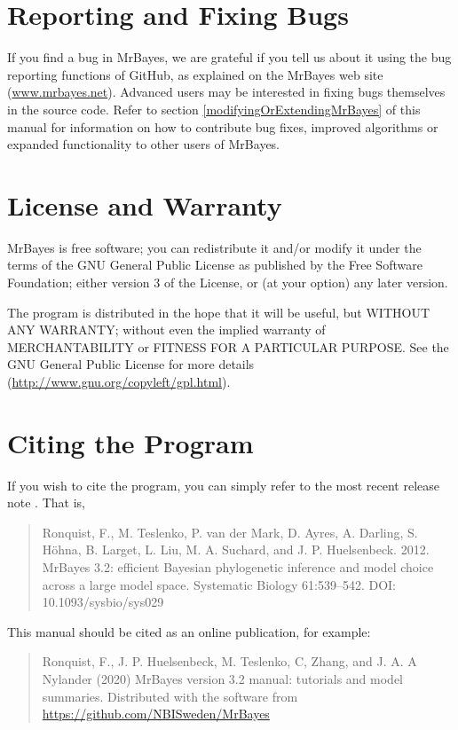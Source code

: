\documentclass[12pt]{book}
\begin{document}
\section{Reporting and Fixing Bugs}

If you find a bug in MrBayes, we are grateful if you tell us about it using the bug reporting
functions of GitHub, as explained on the MrBayes web site (\url{www.mrbayes.net}).  Advanced users
may be interested in fixing bugs themselves in the source code. Refer to section
\ref{modifyingOrExtendingMrBayes} of this manual for information on how to contribute bug fixes,
improved algorithms or expanded functionality to other users of MrBayes.

\section{License and Warranty}

MrBayes is free software; you can redistribute it and/or modify it under the terms of the GNU
General Public License as published by the Free Software Foundation; either version 3 of the
License, or (at your option) any later version.

The program is distributed in the hope that it will be useful, but WITHOUT ANY WARRANTY; without
even the implied warranty of MERCHANTABILITY or FITNESS FOR A PARTICULAR PURPOSE. See the GNU
General Public License for more details (\url{http://www.gnu.org/copyleft/gpl.html}).

\section{Citing the Program}

If you wish to cite the program, you can simply refer to the most recent release note
\citep{ronquist12b}. That is,

\begin{quote}\footnotesize
Ronquist, F., M. Teslenko, P. van der Mark, D. Ayres, A. Darling, S. H\"{o}hna, B. Larget, L. Liu,
M. A. Suchard, and J. P. Huelsenbeck. 2012. MrBayes 3.2: efficient Bayesian phylogenetic
inference and model choice across a large model space. Systematic Biology 61:539--542. DOI:
10.1093/sysbio/sys029
\end{quote}

This manual should be cited as an online publication, for example:

\begin{quote}\footnotesize
Ronquist, F., J. P. Huelsenbeck, M. Teslenko, C, Zhang, and J. A. A Nylander (2020) MrBayes version
3.2 manual: tutorials and model summaries. Distributed with the software from
\url{https://github.com/NBISweden/MrBayes}
\end{quote}
\end{document}
